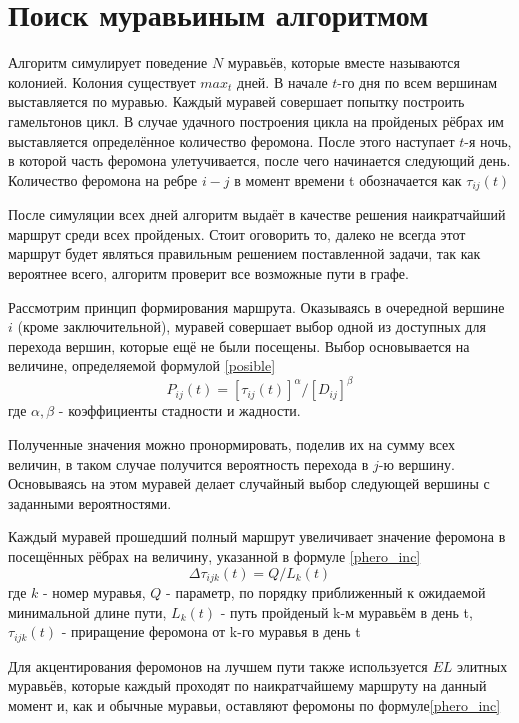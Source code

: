\section{Поиск муравьиным алгоритмом}
Алгоритм симулирует поведение $N$ муравьёв, которые вместе называются колонией. Колония существует $max_t$ дней. В начале $t$-го дня по всем вершинам выставляется по муравью. Каждый муравей совершает попытку построить гамельтонов цикл. В случае удачного построения цикла на пройденых рёбрах им выставляется определённое количество феромона. После этого наступает $t$-я ночь, в которой часть феромона улетучивается, после чего начинается следующий день. Количество феромона на ребре $i-j$ в момент времени t обозначается как $\tau_{ij}(t)$

После симуляции всех дней алгоритм выдаёт в качестве решения наикратчайший маршрут среди всех пройденых. Стоит оговорить то, далеко не всегда этот маршрут будет являться правильным решением поставленной задачи, так как вероятнее всего, алгоритм проверит все возможные пути в графе.

Рассмотрим принцип формирования маршрута. Оказываясь в очередной вершине $i$ (кроме заключительной), муравей совершает выбор одной из доступных для перехода вершин, которые ещё не были посещены. Выбор основывается на величине, определяемой формулой \ref{posible}
\begin{equation}\label{posible}
	P_{ij}(t) = [\tau_{ij}(t)]^{\alpha} / [D_{ij}]^{\beta}
\end{equation} где
	$\alpha, \beta$ - коэффициенты стадности и жадности.

Полученные значения можно пронормировать, поделив их на сумму всех величин, в таком случае получится вероятность перехода в $j$-ю вершину. Основываясь на этом муравей делает случайный выбор следующей вершины с заданными вероятностями.

Каждый муравей прошедший полный маршрут увеличивает значение феромона в посещённых рёбрах на величину, указанной в формуле \ref{phero_inc}
\begin{equation}\label{phero_inc}
	\Delta\tau_{ijk}(t) = Q / L_{k}(t)
\end{equation} где
	$k$ - номер муравья,
	$Q$ - параметр, по порядку приближенный к ожидаемой минимальной длине пути,
	$L_{k}(t)$ - путь пройденый k-м муравьём в день t,
	$\tau_{ijk}(t)$ - приращение феромона от k-го муравья в день t
	
Для акцентирования феромонов на лучшем пути также используется $EL$ элитных муравьёв, которые каждый проходят по наикратчайшему маршруту на данный момент и, как и обычные муравьи, оставляют феромоны по формуле\ref{phero_inc}

